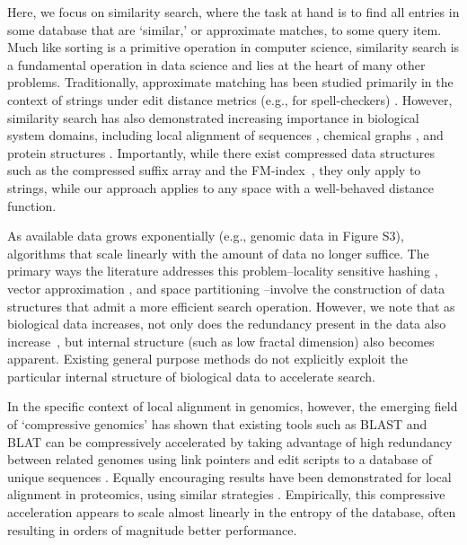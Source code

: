 \documentclass[review,preprint,12pt]{elsarticle}
\renewcommand{\cite}{\citep} %
\theoremstyle{definition}
\theoremstyle{remark}
\numberwithin{equation}{section}
\begin{document}
Here, we focus on similarity search, where the task at hand is to find all entries in some database that are `similar,' or approximate matches, to some query item.
Much like sorting is a primitive operation in computer science, similarity search is a fundamental operation in data science and lies at the heart of many other problems.
Traditionally, approximate matching has been studied primarily in the context of strings under edit distance metrics (e.g., for spell-checkers) \cite{ukkonen1985algorithms}.
However, similarity search has also demonstrated increasing importance in biological system domains, including local alignment of sequences \cite{altschul1990basic, kent2002blat}, chemical graphs \cite{schaeffer2007graph}, and protein structures \cite{budowski2010fragbag}.
Importantly, while there exist compressed data structures such as the 
compressed suffix array and the FM-index~\cite{grossi2005compressed, ferragina2000opportunistic}, they only apply to strings, while our approach 
applies to any space with a well-behaved distance function.

As available data grows exponentially \cite{berger2013computational,yu2015quality} (e.g., genomic data in Figure S3), 
algorithms that scale linearly with the amount of data no longer suffice.
The primary ways the literature addresses this problem--locality sensitive 
hashing \cite{indyk1998approximate}, vector approximation 
\cite{ferhatosmanoglu2000vector}, and space partitioning 
\cite{weber1998quantitative}--involve the construction of data structures that admit a more efficient search operation.
However, we note that as biological data increases, not only does the redundancy present in the data also increase~\cite{loh2012compressive}, but 
internal structure (such as low fractal dimension) also becomes apparent.
Existing general purpose methods do not explicitly exploit the particular internal structure of biological data to accelerate search.

In the specific context of local alignment in genomics, however, the emerging field of `compressive genomics' has shown that existing tools such as BLAST and BLAT can be compressively accelerated by taking advantage of high redundancy between related genomes using link pointers and edit scripts to a database of unique sequences \cite{loh2012compressive}.
Equally encouraging results have been demonstrated for local alignment in 
proteomics, using similar strategies \cite{daniels2013compressive}.
Empirically, this compressive acceleration appears to scale almost linearly in the entropy of the database, often resulting in orders of magnitude better performance.
\end{document}
